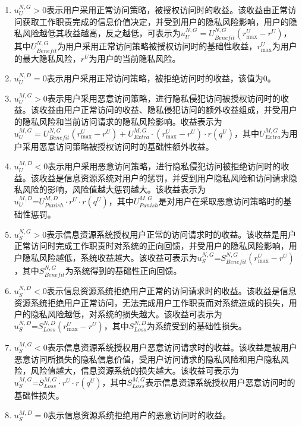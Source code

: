 \begin{enumerate}
	\item  $u_{U}^{N,G}>0$表示用户采用正常访问策略，被授权访问时的收益。该收益由正常访问获取工作职责完成的信息价值决定，并受到用户的隐私风险影响，用户的隐私风险越低其收益越高，反之越低，可表示为$u_{U}^{N,G}=U_{Benefit}^{N,G}(r_{\max }^{U}-{{r}^{U}})$，其中$U_{Benefit}^{N,G}$为用户采用正常访问策略被授权访问时的基础性收益，$r_{\max }^{U}$为用户的最大隐私风险，${{r}^{U}}$为用户的当前隐私风险。
	\item  $u_{U}^{N,D}=0$表示用户采用正常访问策略，被拒绝访问时的收益，该值为0。
	\item  $u_{U}^{M,G}>0$表示用户采用恶意访问策略，进行隐私侵犯访问被授权访问时的收益。该收益由用户正常访问的收益、隐私侵犯访问的额外收益组成，并受用户的隐私风险和当前访问请求的隐私风险影响。收益表示为$u_{U}^{M,G}=U_{Benefit}^{N,G}(r_{\max }^{U}-{{r}^{U}})+U_{Extra}^{M,G}\cdot (r_{\max }^{U}-{{r}^{U}})\cdot r({{q}^{U}})$，其中$U_{Extra}^{M,G}$为用户采用恶意访问策略被授权访问时的基础性额外收益。
	\item  $u_{U}^{M,D}<0$表示用户采用恶意访问策略，进行隐私侵犯访问被拒绝访问时的收益。该收益是信息资源系统对用户的惩罚，并受到用户隐私风险和访问请求隐私风险的影响，风险值越大惩罚越大。该收益表示为$u_{U}^{M,D}\text{=}U_{Punish}^{M,D}\cdot {{r}^{U}}\cdot r({{q}^{U}})$，其中$U_{Punish}^{M,G}$是对用户在采取恶意访问策略时的基础性惩罚。
	\item  $u_{S}^{N,G}>0$表示信息资源系统授权用户正常的访问请求时的收益。该收益是用户正常访问时完成工作职责时对系统的正向回馈，并受用户的隐私风险影响，用户隐私风险越低，系统收益越大。该收益可表示为$u_{S}^{N,G}\text{=}S_{Benefit}^{N,G}(r_{\max }^{U}-{{r}^{U}})$，其中$S_{Benefit}^{N,G}$为系统得到的基础性正向回馈。
	\item $u_{S}^{N,D}<0$表示信息资源系统拒绝用户正常的访问请求时的收益。该收益是信息资源系统拒绝用户正常访问，无法完成用户工作职责而对系统造成的损失，用户的隐私风险越低，对系统的损失越大。该收益可表示为$u_{S}^{N,D}\text{=}S_{Loss}^{N,D}(r_{\max }^{U}-{{r}^{U}})$，其中$S_{Loss}^{N,D}$为系统受到的基础性损失。
	\item  $u_{S}^{M,G}<0$表示信息资源系统授权用户恶意访问请求时的收益。该收益是被用户恶意访问所损失的隐私信息价值，受用户访问请求的隐私风险和用户隐私风险，风险值越大，信息资源系统的损失越大。该收益可表示为$u_{S}^{M,G}\text{=}S_{Loss}^{M,G}\cdot {{r}^{U}}\cdot r({{q}^{U}})$，其中$S_{Loss}^{M,G}$表示信息资源系统授权用户恶意访问时的基础性损失。
	\item $u_{S}^{M,D}=0$表示信息资源系统拒绝用户的恶意访问时的收益。
\end{enumerate}

